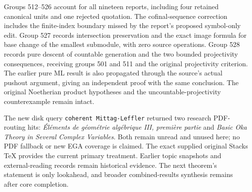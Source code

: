Groups 512--526 account for all nineteen reports, including four retained canonical units and one rejected quotation. The cofinal-sequence correction includes the finite-index boundary missed by the report's proposed symbol-only edit. Group 527 records intersection preservation and the exact image formula for base change of the smallest submodule, with zero source operations. Group 528 records pure descent of countable generation and the two bounded projectivity consequences, receiving groups 501 and 511 and the original projectivity criterion. The earlier pure ML result is also propagated through the source's actual pushout argument, giving an independent proof with the same conclusion. The original Noetherian product hypotheses and the uncountable-projectivity counterexample remain intact.

The new disk query \texttt{coherent\ Mittag-Leffler} returned two research PDF-routing hits: \emph{Éléments de géométrie algébrique III, première partie} and \emph{Basic Oka Theory in Several Complex Variables}. Both remain unread and unused here; no PDF fallback or new EGA coverage is claimed. The exact supplied original Stacks TeX provides the current primary treatment. Earlier topic snapshots and external-reading records remain historical evidence. The next theorem's statement is only lookahead, and broader combined-results synthesis remains after core completion.
